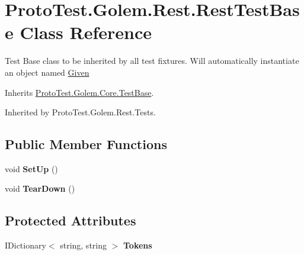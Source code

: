 \hypertarget{class_proto_test_1_1_golem_1_1_rest_1_1_rest_test_base}{\section{Proto\-Test.\-Golem.\-Rest.\-Rest\-Test\-Base Class Reference}
\label{class_proto_test_1_1_golem_1_1_rest_1_1_rest_test_base}
}


Test Base class to be inherited by all test fixtures. Will automatically instantiate an object named \hyperlink{class_proto_test_1_1_golem_1_1_rest_1_1_given}{Given}  




Inherits \hyperlink{class_proto_test_1_1_golem_1_1_core_1_1_test_base}{Proto\-Test.\-Golem.\-Core.\-Test\-Base}.



Inherited by Proto\-Test.\-Golem.\-Rest.\-Tests.

\subsection*{Public Member Functions}
\begin{DoxyCompactItemize}
\item 
\hypertarget{class_proto_test_1_1_golem_1_1_rest_1_1_rest_test_base_a3ee5190f32bacebca4299d4f11999c8b}{void {\bfseries Set\-Up} ()}\label{class_proto_test_1_1_golem_1_1_rest_1_1_rest_test_base_a3ee5190f32bacebca4299d4f11999c8b}

\item 
\hypertarget{class_proto_test_1_1_golem_1_1_rest_1_1_rest_test_base_a72b15b11ad567d962f883b2d2f36b71f}{void {\bfseries Tear\-Down} ()}\label{class_proto_test_1_1_golem_1_1_rest_1_1_rest_test_base_a72b15b11ad567d962f883b2d2f36b71f}

\end{DoxyCompactItemize}
\subsection*{Protected Attributes}
\begin{DoxyCompactItemize}
\item 
\hypertarget{class_proto_test_1_1_golem_1_1_rest_1_1_rest_test_base_a886b9b646d417d9e8f61f415d47ea5a6}{I\-Dictionary$<$ string, string $>$ {\bfseries Tokens}}\label{class_proto_test_1_1_golem_1_1_rest_1_1_rest_test_base_a886b9b646d417d9e8f61f415d47ea5a6}

\end{DoxyCompactItemize}
